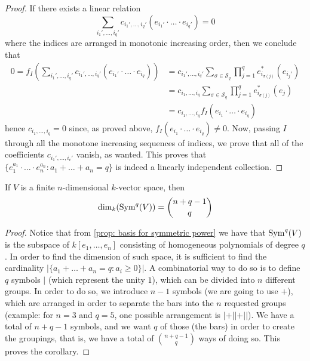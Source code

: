\begin{proof}
  If there exists a linear relation
  \[
    \sum_{i_1', \dots, i_q'} c_{i_1', \dots, i_q'} (e_{i_1'} \cdot \ldots \cdot
    e_{i_q'}) = 0
  \] 
  where the indices are arranged in monotonic increasing order, then we conclude
  that
  \begin{align*}
    0 = f_I \left( \sum_{i_1', \dots, i_q'} c_{i_1', \dots, i_q'} (e_{i_1'} \cdot
    \ldots \cdot e_{i_q}) \right) 
    &= c_{i_1', \dots, i_q'} \sum_{\sigma \in \mathcal S_q} \prod_{j=1}^q
    e_{i_{\sigma(j)}}^*(e_{i_j'}) \\
    &= c_{i_1, \dots, i_q} \sum_{\sigma \in \mathcal S_q} \prod_{j=1}^q
    e_{i_{\sigma(j)}}^*(e_j) \\
    &=  c_{i_1, \dots, i_q} f_I(e_{i_1} \cdot \ldots \cdot e_{i_q}) 
  \end{align*}
  hence \(c_{i_1, \dots, i_q} = 0\) since, as proved above, \(f_I(e_{i_1} \cdot
  \ldots \cdot e_{i_q}) \neq 0\). Now, passing \(I\) through all the monotone
  increasing sequences of indices, we prove that all of the coefficients
  \(c_{i_1', \dots, i_c'}\) vanish, as wanted. This proves that \(\{e_1^{a_1}
  \cdot \ldots \cdot e_n^{a_n} : a_1 + \dots + a_n = q\}\) is indeed a linearly
  independent collection.
\end{proof}

\begin{corollary}
  If \(V\) is a finite \(n\)-dimensional \(k\)-vector space, then
  \[
    \dim_k(\operatorname{Sym}^q(V)) = \binom{n + q - 1}{q}
  \] 
\end{corollary}

\begin{proof}
  Notice that from \cref{prop: basis for symmetric power} we have that
  \(\operatorname{Sym}^q(V)\) is the subspace of \(k[e_1, \dots, e_n]\) consisting of
  homogeneous polynomials of degree \(q\). In order to find the dimension of
  such space, it is sufficient to find the cardinality \(|\{a_1 + \dots + a_n =
  q : a_i \geq 0\}|\). A combinatorial way to do so is to define \(q\)
  symbols \(|\) (which represent the unity \(1\)), which can be divided into
  \(n\) different groups. In order to do so, we introduce \(n - 1\) symbols (we
  are going to use \(+\)), which are arranged in order to separate the bars into
  the \(n\) requested groups (example: for \(n = 3\) and \(q = 5\), one possible
  arrangement is \(| + || + ||\)). We have a total of \(n + q - 1\) symbols, and
  we want \(q\) of those (the bars) in order to create the groupings, that
  is, we have a total of \(\binom{n + q - 1}{q}\) ways of doing so. This proves
  the corollary.
\end{proof}

